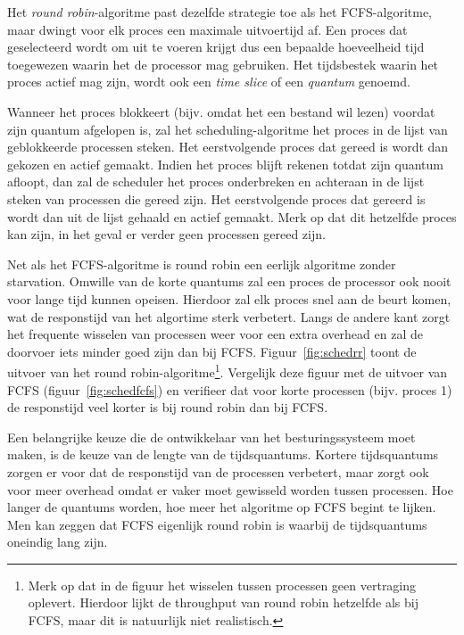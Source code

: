 Het \emph{round robin}-algoritme past dezelfde strategie toe als het FCFS-algoritme, maar dwingt voor elk proces een maximale uitvoertijd af. Een proces dat geselecteerd wordt om uit te voeren krijgt dus een bepaalde hoeveelheid tijd toegewezen waarin het de processor mag gebruiken. Het tijdsbestek waarin het proces actief mag zijn, wordt ook een \emph{time slice} of een \emph{quantum} genoemd.

Wanneer het proces blokkeert (bijv. omdat het een bestand wil lezen) voordat zijn quantum afgelopen is, zal het scheduling-algoritme het proces in de lijst van geblokkeerde processen steken. Het eerstvolgende proces dat gereed is wordt dan gekozen en actief gemaakt. Indien het proces blijft rekenen totdat zijn quantum afloopt, dan zal de scheduler het proces onderbreken en achteraan in de lijst steken van processen die gereed zijn. Het eerstvolgende proces dat gereerd is wordt dan uit de lijst gehaald en actief gemaakt. Merk op dat dit hetzelfde proces kan zijn, in het geval er verder geen processen gereed zijn.

Net als het FCFS-algoritme is round robin een eerlijk algoritme zonder starvation. Omwille van de korte quantums zal een proces de processor ook nooit voor lange tijd kunnen opeisen. Hierdoor zal elk proces snel aan de beurt komen, wat de responstijd van het algortime sterk verbetert. Langs de andere kant zorgt het frequente wisselen van processen weer voor een extra overhead en zal de doorvoer iets minder goed zijn dan bij FCFS. Figuur~\ref{fig:schedrr} toont de uitvoer van het round robin-algoritme\footnote{Merk op dat in de figuur het wisselen tussen processen geen vertraging oplevert. Hierdoor lijkt de throughput van round robin hetzelfde als bij FCFS, maar dit is natuurlijk niet realistisch.}. Vergelijk deze figuur met de uitvoer van FCFS (figuur~\ref{fig:schedfcfs}) en verifieer dat voor korte processen (bijv. proces 1) de responstijd veel korter is bij round robin dan bij FCFS.

Een belangrijke keuze die de ontwikkelaar van het besturingssysteem moet maken, is de keuze van de lengte van de tijdsquantums. Kortere tijdsquantums zorgen er voor dat de responstijd van de processen verbetert, maar zorgt ook voor meer overhead omdat er vaker moet gewisseld worden tussen processen. Hoe langer de quantums worden, hoe meer het algoritme op FCFS begint te lijken. Men kan zeggen dat FCFS eigenlijk round robin is waarbij de tijdsquantums oneindig lang zijn.

